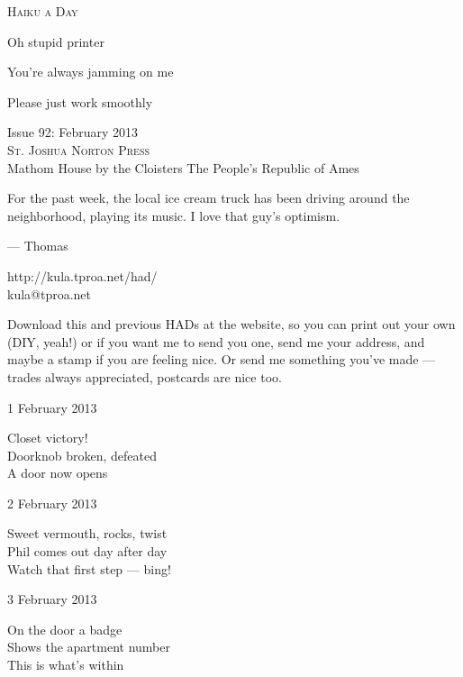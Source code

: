 \documentclass[12pt]{article}
\begin{document}
\begin{center}
{\fontsize{36}{48}\selectfont \textsc{Haiku a Day }}
\end{center}

\vspace*{3.5cm}

{\fontsize{20}{40}\selectfont 

Oh stupid printer

You're always jamming on me

Please just work smoothly

}

\vspace*{5.0cm}
\begin{center}
{\large{Issue 92: February 2013}} \\[5mm]
{\fontsize{8}{8}\selectfont  \textsc{ St. Joshua Norton Press }} \\[1mm]
{\fontsize{6}{6}\selectfont Mathom House by the Cloisters \textbar The People's Republic of Ames }
\end{center}


\newpage

For the past week, the local ice cream truck has been driving around the neighborhood,
playing its music. I love that guy's optimism.

--- Thomas

http://kula.tproa.net/had/ \\
kula@tproa.net

Download this and previous HADs at the website, so you can
print out your own (DIY, yeah!) or if you want me to send
you one, send me your address, and maybe a stamp if you
are feeling nice. Or send me something you've made ---
trades always appreciated, postcards are nice too.

\vfill

\newpage

1 February 2013

Closet victory! \\
Doorknob broken, defeated \\
A door now opens

2 February 2013

Sweet vermouth, rocks, twist \\
Phil comes out day after day \\
Watch that first step --- bing!

3 February 2013

On the door a badge \\
Shows the apartment number \\
This is what's within
\end{document}
